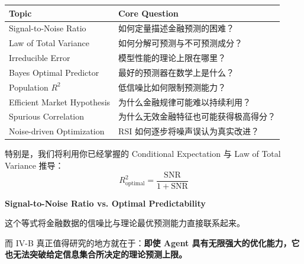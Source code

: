 \begin{readertable}
\begin{longtable}[]{@{}
  >{\raggedright\arraybackslash}p{}
  >{\raggedright\arraybackslash}p{}@{}}
\toprule
Topic & Core Question \\
\midrule
\endhead
Signal-to-Noise Ratio & 如何定量描述金融预测的困难？ \\
Law of Total Variance & 如何分解可预测与不可预测成分？ \\
Irreducible Error & 模型性能的理论上限在哪里？ \\
Bayes Optimal Predictor & 最好的预测器在数学上是什么？ \\
Population \(R^2\) & 低信噪比如何限制预测能力？ \\
Efficient Market Hypothesis & 为什么金融规律可能难以持续利用？ \\
Spurious Correlation & 为什么无效金融特征也可能获得极高得分？ \\
Noise-driven Optimization & RSI 如何逐步将噪声误认为真实改进？ \\
\bottomrule
\end{longtable}
\end{readertable}

特别是，我们将利用你已经掌握的 Conditional Expectation 与 Law of Total Variance 推导：
\[\boxed{
R_{\mathrm{optimal}}^2
=
\frac{\mathrm{SNR}}{1+\mathrm{SNR}}
}\]

\textbf{Signal-to-Noise Ratio vs. Optimal Predictability}


这个等式将金融数据的信噪比与理论最优预测能力直接联系起来。

而 IV-B 真正值得研究的地方就在于：\textbf{即使 Agent 具有无限强大的优化能力，它也无法突破给定信息集合所决定的理论预测上限。}
